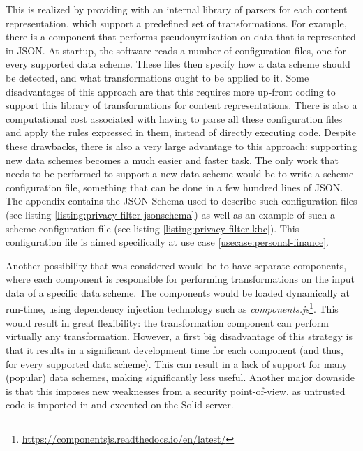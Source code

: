 This is realized by providing \middleware{} with an internal library of parsers for each content representation, which support a predefined set of transformations. For example, there is a component that performs pseudonymization on data that is represented in JSON. At startup, the software reads a number of configuration files, one for every supported data scheme. These files then specify how a data scheme should be detected, and what transformations ought to be applied to it. Some disadvantages of this approach are that this requires more up-front coding to support this library of transformations for content representations. There is also a computational cost associated with having to parse all these configuration files and apply the rules expressed in them, instead of directly executing code. Despite these drawbacks, there is also a very large advantage to this approach: supporting new data schemes becomes a much easier and faster task. The only work that needs to be performed to support a new data scheme would be to write a scheme configuration file, something that can be done in a few hundred lines of JSON. The appendix contains the JSON Schema used to describe such configuration files (see listing \ref{listing:privacy-filter-jsonschema}) as well as an example of such a scheme configuration file (see listing \ref{listing:privacy-filter-kbc}). This configuration file is aimed specifically at use case \ref{usecase:personal-finance}.

Another possibility that was considered would be to have separate components, where each component is responsible for performing transformations on the input data of a specific data scheme. The components would be loaded dynamically at run-time, using dependency injection technology such as \textit{components.js}\footnote{\url{https://componentsjs.readthedocs.io/en/latest/}}. This would result in great flexibility: the transformation component can perform virtually any transformation. However, a first big disadvantage of this strategy is that it results in a significant development time for each component (and thus, for every supported data scheme). This can result in a lack of support for many (popular) data schemes, making \middleware{} significantly less useful. Another major downside is that this imposes new weaknesses from a security point-of-view, as untrusted code is imported in and executed on the Solid server. 




